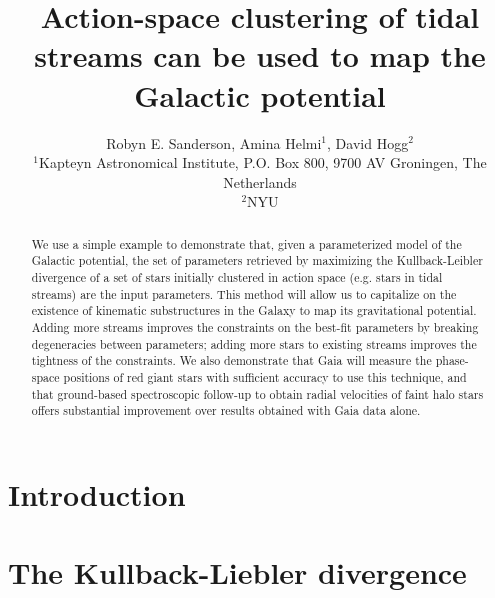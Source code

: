\documentclass[useAMS,usenatbib,a4paper]{mn2e}
\begin{document}
\title{Action-space clustering of tidal streams can be used to map the Galactic potential}
\author[]{Robyn E. Sanderson, Amina Helmi${}^{1}$, David Hogg${}^{2}$\\
${}^{1}$Kapteyn Astronomical Institute, P.O. Box 800, 9700 AV Groningen, The Netherlands\\
${}^{2}$NYU}

\maketitle

\begin{abstract}
We use a simple example to demonstrate that, given a parameterized model of the Galactic potential, the set of parameters retrieved by maximizing the Kullback-Leibler divergence of a set of stars initially clustered in action space (e.g. stars in tidal streams) are the input parameters. This method will allow us to capitalize on the existence of kinematic substructures in the Galaxy to map its gravitational potential. Adding more streams improves the constraints on the best-fit parameters by breaking degeneracies between parameters; adding more stars to existing streams improves the tightness of the constraints. We also demonstrate that Gaia will measure the phase-space positions of red giant stars with sufficient accuracy to use this technique, and that ground-based spectroscopic follow-up to obtain radial velocities of faint halo stars offers substantial improvement over results obtained with Gaia data alone. 
\end{abstract}


\section{Introduction}
\label{sec:intro}

\section{The Kullback-Liebler divergence}
\label{sec:kld}
\end{document}
